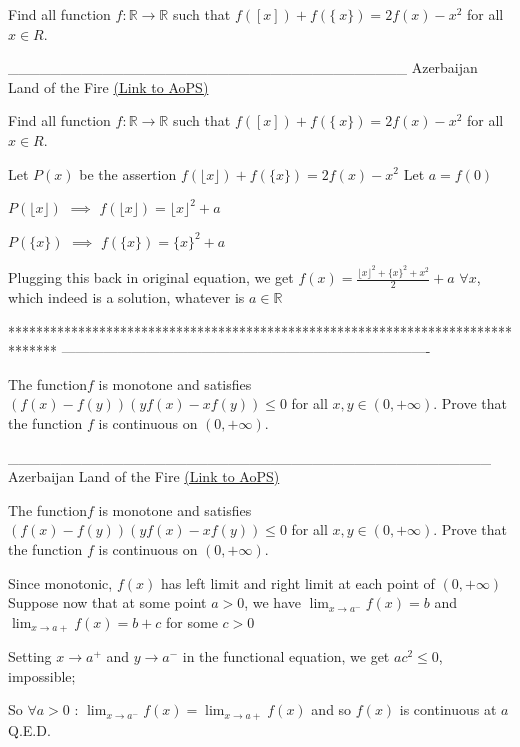 \begin{problem}
	Find all function $f: \mathbb{R}\to\mathbb{R}$ such that $f([ x ])+f(\{\ x\})=2f(x)-x^2$ for all $x{\in}R$.

______________________________________
Azerbaijan Land of the Fire 
	\flushright \href{https://artofproblemsolving.com/community/c6h529335}{(Link to AoPS)}
\end{problem}



\begin{solution}
	\begin{tcolorbox}Find all function $f: \mathbb{R}\to\mathbb{R}$ such that $f([ x ])+f(\{\ x\})=2f(x)-x^2$ for all $x{\in}R$.\end{tcolorbox}
Let $P(x)$ be the assertion $f(\lfloor x\rfloor)+f(\{x\})=2f(x)-x^2$
Let $a=f(0)$

$P(\lfloor x\rfloor)$ $\implies$ $f(\lfloor x\rfloor)=\lfloor x\rfloor^2+a$

$P(\{x\})$ $\implies$ $f(\{x\})=\{x\}^2+a$

Plugging this back in original equation, we get $\boxed{f(x)=\frac{\lfloor x\rfloor^2+\{x\}^2+x^2}2+a}$ $\forall x$, which indeed is a solution, whatever is $a\in\mathbb R$
\end{solution}
*******************************************************************************
-------------------------------------------------------------------------------

\begin{problem}
	The function$ f $ is monotone and satisfies $(f(x)-f(y))(yf(x)-xf(y)){\leq}0$ for all $x,y{\in}(0,+\infty)$.
Prove that the function $f$  is continuous on $(0,+\infty)$.

______________________________________________
Azerbaijan Land of the Fire 
	\flushright \href{https://artofproblemsolving.com/community/c6h529472}{(Link to AoPS)}
\end{problem}



\begin{solution}
	\begin{tcolorbox}The function$ f $ is monotone and satisfies $(f(x)-f(y))(yf(x)-xf(y)){\leq}0$ for all $x,y{\in}(0,+\infty)$.
Prove that the function $f$  is continuous on $(0,+\infty)$.\end{tcolorbox}
Since monotonic, $f(x)$ has left limit and right limit at each point of $(0,+\infty)$
Suppose now that at some point $a>0$, we have $\lim_{x\to a^-}f(x)=b$ and $\lim_{x\to a+}f(x)=b+c$ for some $c>0$

Setting $x\to a^+$ and $y\to a^-$ in the functional equation, we get $ac^2\le 0$, impossible;

So $\forall a>0$ : $\lim_{x\to a^-}f(x)=\lim_{x\to a+}f(x)$ and so $f(x)$ is continuous at $a$
Q.E.D.
\end{solution}



